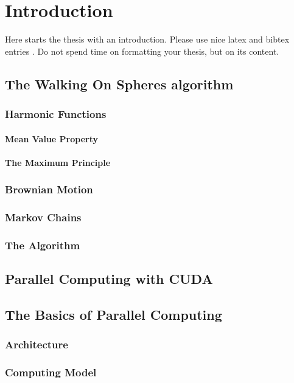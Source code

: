 \chapter{Introduction}
\label{chapter:Introduction}



Here starts the thesis with an introduction. Please use nice latex and bibtex entries \cite{Sabelfeld}. Do not spend time on formatting your thesis, but on its content.

\section{The Walking On Spheres algorithm}
\subsection{Harmonic Functions}
\subsubsection{Mean Value Property}
\subsubsection{The Maximum Principle}
\subsection{Brownian Motion}
\subsection{Markov Chains}
\subsection{The Algorithm}



\section{Parallel Computing with CUDA}
\section{The Basics of Parallel Computing}
\subsection{Architecture}
\subsection{Computing Model}
